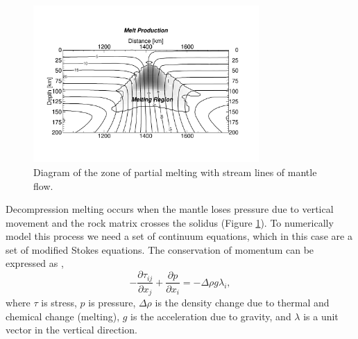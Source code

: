 \begin{figure}
\centering
\includegraphics[width=8.6cm]{./figures/ch2-melt-region.pdf}
\caption{Diagram of the zone of partial melting with stream lines of mantle flow.}
\label{fg:melt-region}
\end{figure}

Decompression melting occurs when the mantle loses pressure due to vertical movement and the rock matrix crosses the solidus (Figure \ref{fg:melt-region}). To numerically model this process we need a set of continuum equations, which in this case are a set of modified Stokes equations. The conservation of momentum can be expressed as \citep[e.g.][]{armitage-etal-jgr-2013},
\begin{equation}
-\frac{\partial \tau_{ij}}{\partial x_{j}} + \frac{\partial p}{\partial x_{i}} = -\Delta\rho g\lambda_{i},
\label{eq:momentum}
\end{equation}
where $\tau$ is stress, $p$ is pressure, $\Delta\rho$ is the density change due to thermal and chemical change (melting), $g$ is the acceleration due to gravity, and $\lambda$ is a unit vector in the vertical direction.

